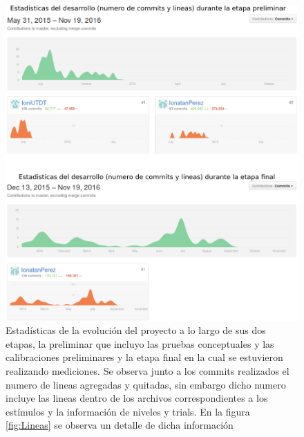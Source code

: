 \documentclass{article}
\begin{document}
    \begin{figure}
        \center
        \includegraphics[width=\textwidth]{Imagenes/Commits.png}
        \caption{Estadísticas de la evolución del proyecto a lo largo de sus dos etapas, la preliminar que incluyo las pruebas conceptuales y las calibraciones preliminares y la etapa final en la cual se estuvieron realizando mediciones. Se observa junto a los commits realizados el numero de lineas agregadas y quitadas, sin embargo dicho numero incluye las lineas dentro de los archivos correspondientes a los estímulos y la información de niveles y trials. En la figura \ref{fig:Lineas} se observa un detalle de dicha información}
        \label{fig:Commits}
    \end{figure}
    
\end{document}
